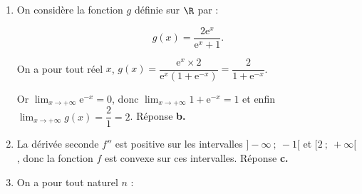 
\medskip


\medskip

\begin{enumerate}
\item On considère la fonction $g$ définie sur $\R$ par : 

\[ g(x) = \dfrac{2\text{e}^x}{\text{e}^x +1}.\]

\smallskip



On a pour tout réel $x$, \: $g(x) = \dfrac{\text{e}^x \times 2 }{\text{e}^x\left(1 + \text{e}^{-x}\right)} = \dfrac{2}{1 + \text{e}^{-x}}$.

Or $\displaystyle\lim_{x \to + \infty} \text{e}^{-x} = 0$, donc $\displaystyle\lim_{x \to + \infty} 1 + \text{e}^{-x} = 1$ et enfin $\displaystyle\lim_{x \to + \infty} g(x) = \dfrac{2}{1} = 2$. \hfill Réponse \textbf{b.}

\item La dérivée seconde $f''$ est positive sur les intervalles $]- \infty~;~-1[$ et $[2~;~+ \infty[$, donc la fonction $f$ est convexe sur ces intervalles. \hfill Réponse \textbf{c.}

\item %

%
On a pour tout naturel $n$ :


\end{enumerate}
